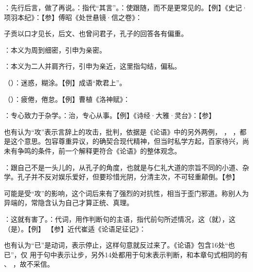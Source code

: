 {
\begin{lyitemize}
\item {}：先行后言，做了再说。：指代“其言”。：使跟随，而不是更常见的。【例】《史记·项羽本纪》：【参】傅昭《处世悬镜·信之卷》：
\end{lyitemize}
子贡以口才见长，后文、也曾问君子，孔子的回答各有偏重。
}
{} %


{
\item {}：本义为周到细密，引申为亲密。
\item {}：本义为二人并肩齐行，引申为亲近，这里指勾结，偏私。
}  %
{}


{
\item {}（）：迷惑，糊涂。【例】成语“欺君上”。
\item {}（）：疲倦，倦怠。【例】曹植《洛神赋》：
}
{}


{
\item {}：专心致力于杂学。：治，专心从事。【例】《诗经·大雅·灵台》：【参】

也有认为“攻”表示言辞上的攻击，批判，依据是《论语》中的另外两例， ， ，都是这个意思。包容尊重异议，的确契合现代精神，但当时私学方起，百家待兴，尚未有争鸣的条件，前一个解释更符合《论语》的整体观念。

：跟自己不是一头儿的，从孔子的角度，也就是与仁礼大道的宗旨不同的小道、杂学。孔子并不反对娱乐爱好，但要珍惜光阴，分清主次，不可轻重颠倒。【参】  

可能是受“攻”的影响，这个词后来有了强烈的对抗性，相当于歪门邪道。称别人为异端的，常隐含认为自己才算正统、真理。

\item {}：这就有害了。：代词，用作判断句的主语，指代前句所述情况，这（就），这（是）。【例】 【参】近代崔适《论语足征记》：

也有认为“已”是动词，表示停止，这样句意就反过来了。《论语》包含16处“也已”，仅  用于句中表示让步，另外14处都用于句末表示判断，和本章句式相同的有  、 ，故不采信。
}
{}


